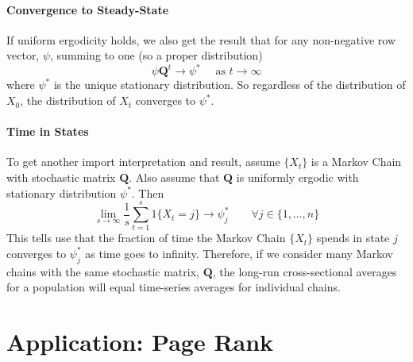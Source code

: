 \documentclass[12pt]{article}
\theoremstyle{plain}
\theoremstyle{definition}
\theoremstyle{remark}
\begin{document}
\paragraph{Convergence to Steady-State}
If uniform ergodicity holds, we also get the result that
for any non-negative row vector, $\psi$, summing to one (so a
proper distribution)
\[ \psi \mathbf{Q}^t \rightarrow \psi^* \quad \text{ as }
	t\rightarrow \infty \]
where $\psi^*$ is the unique stationary distribution. So
regardless of the distribution of $X_0$, the distribution 
of $X_t$ converges to $\psi^*$.

\paragraph{Time in States} To get another import interpretation
and result, assume $\{X_t\}$ is a Markov Chain with stochastic 
matrix $\mathbf{Q}$. Also assume that $\mathbf{Q}$ is 
uniformly ergodic with stationary distribution $\psi^*$. Then
\begin{equation}
    \lim_{s\rightarrow\infty}
    \frac{1}{s} \sum^s_{t=1} 1\{X_t = j\} \rightarrow
	\psi^*_j  \qquad
	\forall j \in \{1, \ldots, n\}
\end{equation}
This tells use that the fraction of time the Markov Chain
$\{X_t\}$ spends in state $j$ converges to $\psi^*_j$ as
time goes to infinity.  Therefore, if we consider many
Markov chains with the same stochastic matrix, $\mathbf{Q}$,
the long-run cross-sectional averages for a population will
equal time-series averages for individual chains.



\newpage
\section{Application: Page Rank}
\end{document}
